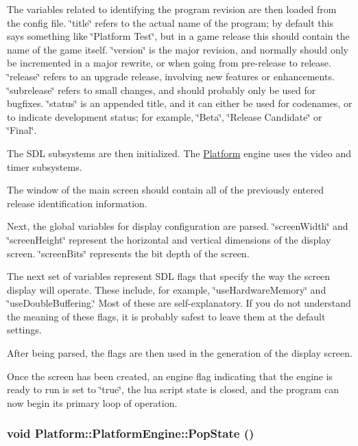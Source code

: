 The variables related to identifying the program revision are then loaded from the config file. \char`\"{}title\char`\"{} refers to the actual name of the program; by default this says something like \char`\"{}Platform Test\char`\"{}, but in a game release this should contain the name of the game itself. \char`\"{}version\char`\"{} is the major revision, and normally should only be incremented in a major rewrite, or when going from pre-release to release. \char`\"{}release\char`\"{} refers to an upgrade release, involving new features or enhancements. \char`\"{}subrelease\char`\"{} refers to small changes, and should probably only be used for bugfixes. \char`\"{}status\char`\"{} is an appended title, and it can either be used for codenames, or to indicate development status; for example, \char`\"{}Beta\char`\"{}, \char`\"{}Release Candidate\char`\"{} or \char`\"{}Final\char`\"{}.

The SDL subsystems are then initialized. The \hyperlink{namespace_platform}{Platform} engine uses the video and timer subsystems.

The window of the main screen should contain all of the previously entered release identification information.

Next, the global variables for display configuration are parsed. \char`\"{}screenWidth\char`\"{} and \char`\"{}screenHeight\char`\"{} represent the horizontal and vertical dimensions of the display screen. \char`\"{}screenBits\char`\"{} represents the bit depth of the screen.

The next set of variables represent SDL flags that specify the way the screen display will operate. These include, for example, \char`\"{}useHardwareMemory\char`\"{} and \char`\"{}useDoubleBuffering.\char`\"{} Most of these are self-explanatory. If you do not understand the meaning of these flags, it is probably safest to leave them at the default settings.

After being parsed, the flags are then used in the generation of the display screen.

Once the screen has been created, an engine flag indicating that the engine is ready to run is set to \char`\"{}true\char`\"{}, the lua script state is closed, and the program can now begin its primary loop of operation.\hypertarget{class_platform_1_1_platform_engine_3b2f23576d40b0a97f8f6477d5156bdf}{
\subsubsection[{PopState}]{\setlength{\rightskip}{0pt plus 5cm}void Platform::PlatformEngine::PopState ()}}
\label{d2/dd5/class_platform_1_1_platform_engine_3b2f23576d40b0a97f8f6477d5156bdf}


